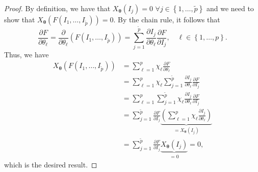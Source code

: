 \documentclass[10pt,a4paper]{amsart}
\begin{document}
\begin{proof}
By definition, we have that $X_{\boldsymbol{\theta}}(I_{j})=0$ $\forall j\in\left\{1,\ldots,\tilde{p}\right\}$ and we need to show that $X_{\boldsymbol{\theta}}\left(F\left(I_{1},\ldots,I_{\tilde{p}}\right)\right)=0$. By the chain rule, it follows that
\begin{equation}
\frac{\partial F}{\partial\theta_{\ell}}=\frac{\partial}{\partial\theta_{\ell}}\left(F\left(I_{1},\ldots,I_{\tilde{p}}\right)\right)=\sum_{j=1}^{\tilde{p}}\frac{\partial I_{j}}{\partial\theta_{\ell}}\frac{\partial F}{\partial I_{j}},\quad\ell\in\left\{1,\ldots,p\right\}.
\end{equation}
Thus, we have
\begin{align}
X_{\boldsymbol{\theta}}\left(F\left(I_{1},\ldots,I_{\tilde{p}}\right)\right)&=\sum_{\ell=1}^{p}\chi_{\ell}\frac{\partial F}{\partial\theta_{\ell}}\nonumber\\
&=\sum_{\ell=1}^{p}\chi_{\ell}\sum_{j=1}^{\tilde{p}}\frac{\partial I_{j}}{\partial\theta_{\ell}}\frac{\partial F}{\partial I_{j}}\nonumber\\
&=\sum_{\ell=1}^{p}\sum_{j=1}^{\tilde{p}}\chi_{\ell}\frac{\partial I_{j}}{\partial\theta_{\ell}}\frac{\partial F}{\partial I_{j}}\nonumber\\
    &=\sum_{j=1}^{\tilde{p}}\frac{\partial F}{\partial I_{j}}\underset{=X_{\boldsymbol{\theta}}(I_{j})}{\underbrace{\left(\sum_{\ell=1}^{p}\chi_{\ell}\frac{\partial I_{j}}{\partial\theta_{\ell}}\right)}}\nonumber\\
    &=\sum_{j=1}^{\tilde{p}}\frac{\partial F}{\partial I_{j}}\underset{=0}{\underbrace{X_{\boldsymbol{\theta}}(I_{j})}}=0,
\end{align}
which is the desired result.
\end{proof}
\end{document}

